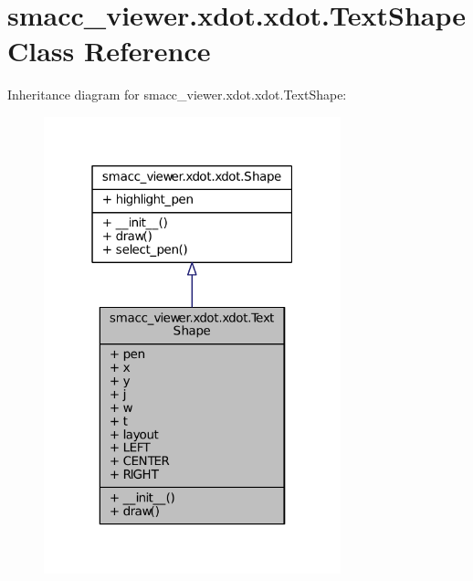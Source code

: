 \hypertarget{classsmacc__viewer_1_1xdot_1_1xdot_1_1TextShape}{}\section{smacc\+\_\+viewer.\+xdot.\+xdot.\+Text\+Shape Class Reference}
\label{classsmacc__viewer_1_1xdot_1_1xdot_1_1TextShape}


Inheritance diagram for smacc\+\_\+viewer.\+xdot.\+xdot.\+Text\+Shape\+:
\nopagebreak
\begin{figure}[H]
\begin{center}
\leavevmode
\includegraphics[width=244pt]{classsmacc__viewer_1_1xdot_1_1xdot_1_1TextShape__inherit__graph}
\end{center}
\end{figure}


